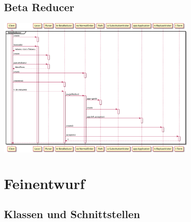 \documentclass[parskip=full,11pt,twoside]{scrbook}
\begin{document}
\subsection{Beta Reducer}
\includegraphics[width=0.75\textwidth]{../uml/SD/BetaReducer.png}


\newpage
\section{Feinentwurf}


\subsection{Klassen und Schnittstellen}

\pagebreak
\end{document}
